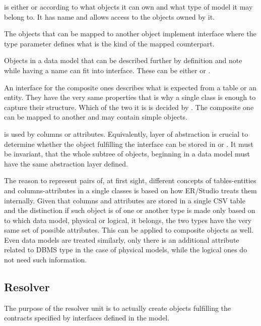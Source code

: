  is either  or  according to what objects it can own and what type of model it may belong to. 
It has name and allows access to the objects owned by it.

The objects that can be mapped to another object implement interface  where the type parameter defines what is the kind of the mapped counterpart.

Objects in a data model that can be described further by definition and note while having a name can fit into  interface. These can be either  or .

An interface for the composite ones describes what is expected from a table or an entity.
They have the very same properties that is why a single class is enough to capture their structure. Which of the two it is is decided by .
The composite one can be mapped to another  and may contain simple objects.

 is used by columns or attributes. Equivalently, layer of abstraction is crucial to determine whether the object fulfilling the interface can be stored in  or . It must be invariant, that the whole subtree of objects, beginning in a data model must have the same abstraction layer defined.

The reason to represent pairs of, at first sight, different concepts of tables-entities and columns-attributes in a single classes is based on how ER/Studio treats them internally. Given that columns and attributes are stored in a single CSV table and the distinction if such object is of one or another type is made only based on to which data model, physical or logical, it belongs, the two types have the very same set of possible attributes. This can be applied to composite objects as well. Even data models are treated similarly, only there is an additional attribute related to DBMS type in the case of physical models, while the logical ones do not need such information.
 

\subsection{Resolver}

The purpose of the resolver unit is to actually create objects fulfilling the contracts specified by interfaces defined in the model.

